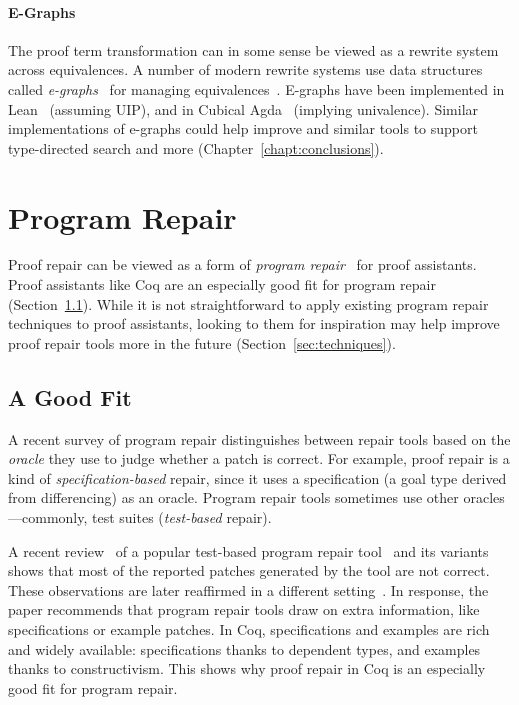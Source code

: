 \paragraph{E-Graphs} %
The \toolnamec proof term transformation can in some sense be viewed as a rewrite system across equivalences.
A number of modern rewrite systems use data structures called \textit{e-graphs}~\cite{egraph1} for managing equivalences~\cite{egg}.
E-graphs have been implemented in Lean~\cite{selsam:lean} (assuming UIP),
and in Cubical Agda~\cite{egraph6} (implying univalence).
Similar implementations of e-graphs could help improve \toolnamec and similar tools to support
type-directed search and more (Chapter~\ref{chapt:conclusions}).

\section{Program Repair}
\label{sec:repair}

Proof repair can be viewed as a form of \textit{program repair}~\cite{Monperrus:2018:ASR:3177787.3105906, Gazzola:2018:ASR:3180155.3182526}
for proof assistants. %
Proof assistants like Coq are an especially good fit for program repair (Section~\ref{sec:lessons}).
While it is not straightforward to apply existing program repair techniques to proof assistants,
looking to them for inspiration may help improve proof repair tools more in the future (Section~\ref{sec:techniques}).

\subsection{A Good Fit}
\label{sec:lessons}

A recent survey of program repair distinguishes between repair tools based on the \textit{oracle} they use to
judge whether a patch is correct.
For example, proof repair is a kind of \textit{specification-based} repair,
since it uses a specification (a goal type derived from differencing) as an oracle.
Program repair tools sometimes use other oracles---commonly, test suites (\textit{test-based} repair).

A recent review~\cite{Qi:2015:APP:2771783.2771791} of a popular test-based program repair tool~\cite{LeGoues:2012:SSA:2337223.2337225} and its variants
shows that most of the reported patches generated by the tool are not correct.
These observations are later reaffirmed in a different setting~\cite{DBLP:journals/corr/abs-1811-02429}.
In response, the paper recommends that program repair tools draw on extra information, like specifications or example patches.
In Coq, specifications and examples are rich and widely available: specifications thanks to dependent types,
and examples thanks to constructivism. This shows why proof repair in Coq is an especially good fit for program repair.
 
